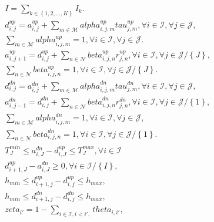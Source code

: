 \begin{align}
  & I = \sum_{k \in \left\{1 , 2 , \ldots , K\right\}} I_{k} . \tag{eq\_0001} \\
  & d_{i , j}^{up} = a_{i , j}^{up} + \sum_{m \in \mathcal{M}} \mathit{alpha}_{i , j , m}^{up} \mathit{tau}_{j , m}^{up} , \forall i \in \mathcal{I} , \forall j \in \mathcal{J} , \tag{eq\_0002} \\
  & \sum_{m \in \mathcal{M}} \mathit{alpha}_{i , j , m}^{up} = 1 , \forall i \in \mathcal{I} , \forall j \in \mathcal{J} . \tag{eq\_0003} \\
  & a_{i , j + 1}^{up} = d_{i , j}^{up} + \sum_{n \in \mathcal{N}} \mathit{beta}_{i , j , n}^{up} r_{j , n}^{up} , \forall i \in \mathcal{I} , \forall j \in \mathcal{J} / \left\{J\right\} , \tag{eq\_0004} \\
  & \sum_{n \in \mathcal{N}} \mathit{beta}_{i , j , n}^{up} = 1 , \forall i \in \mathcal{I} , \forall j \in \mathcal{J} / \left\{J\right\} . \tag{eq\_0005} \\
  & d_{i , j}^{dn} = a_{i , j}^{dn} + \sum_{m \in \mathcal{M}} \mathit{alpha}_{i , j , m}^{dn} \mathit{tau}_{j , m}^{dn} , \forall i \in \mathcal{I} , \forall j \in \mathcal{J} , \tag{eq\_0006} \\
  & a_{i , j - 1}^{dn} = d_{i , j}^{dn} + \sum_{n \in \mathcal{N}} \mathit{beta}_{i , j , n}^{dn} r_{j , n}^{dn} , \forall i \in \mathcal{I} , \forall j \in \mathcal{J} / \left\{1\right\} , \tag{eq\_0007} \\
  & \sum_{m \in \mathcal{M}} \mathit{alpha}_{i , j , m}^{dn} = 1 , \forall i \in \mathcal{I} , \forall j \in \mathcal{J} , \tag{eq\_0008} \\
  & \sum_{n \in \mathcal{N}} \mathit{beta}_{i , j , n}^{dn} = 1 , \forall i \in \mathcal{I} , \forall j \in \mathcal{J} / \left\{1\right\} . \tag{eq\_0009} \\
  & T_{J}^{min} \leq a_{i , J}^{dn} - d_{i , J}^{up} \leq T_{J}^{max} , \forall i \in \mathcal{I} \tag{eq\_0010} \\
  & d_{i + 1 , J}^{up} - a_{i , J}^{dn} \geq 0 , \forall i \in \mathcal{I} / \left\{I\right\} , \tag{eq\_0011} \\
  & h_{min} \leq d_{i + 1 , j}^{up} - d_{i , j}^{up} \leq h_{max} , \tag{eq\_0012} \\
  & h_{min} \leq d_{i + 1 , j}^{dn} - d_{i , j}^{dn} \leq h_{max} , \tag{eq\_0013} \\
  & \mathit{zeta}_{i '} = 1 - \sum_{i \in \mathcal{I} , i < i ' ,} \mathit{theta}_{i , i '} , \tag{eq\_0014} \\

\end{align}
